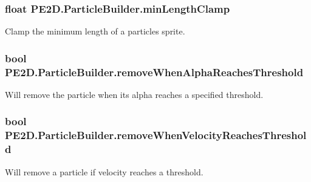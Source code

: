 \subsubsection[{min\+Length\+Clamp}]{\setlength{\rightskip}{0pt plus 5cm}float P\+E2\+D.\+Particle\+Builder.\+min\+Length\+Clamp}\label{struct_p_e2_d_1_1_particle_builder_aff3a3bd2b886093998811a30e7a906fd}


Clamp the minimum length of a particles sprite. 

\hypertarget{struct_p_e2_d_1_1_particle_builder_a18a773bd0ec19ac1eeb2e86603bd3395}{}
\subsubsection[{remove\+When\+Alpha\+Reaches\+Threshold}]{\setlength{\rightskip}{0pt plus 5cm}bool P\+E2\+D.\+Particle\+Builder.\+remove\+When\+Alpha\+Reaches\+Threshold}\label{struct_p_e2_d_1_1_particle_builder_a18a773bd0ec19ac1eeb2e86603bd3395}


Will remove the particle when its alpha reaches a specified threshold. 

\hypertarget{struct_p_e2_d_1_1_particle_builder_a2c37b78b4c75113fb9703c760cd1a34c}{}
\subsubsection[{remove\+When\+Velocity\+Reaches\+Threshold}]{\setlength{\rightskip}{0pt plus 5cm}bool P\+E2\+D.\+Particle\+Builder.\+remove\+When\+Velocity\+Reaches\+Threshold}\label{struct_p_e2_d_1_1_particle_builder_a2c37b78b4c75113fb9703c760cd1a34c}


Will remove a particle if velocity reaches a threshold. 

\hypertarget{struct_p_e2_d_1_1_particle_builder_a5efd39fc998887c16fa23eff2fdf8d4d}{}
